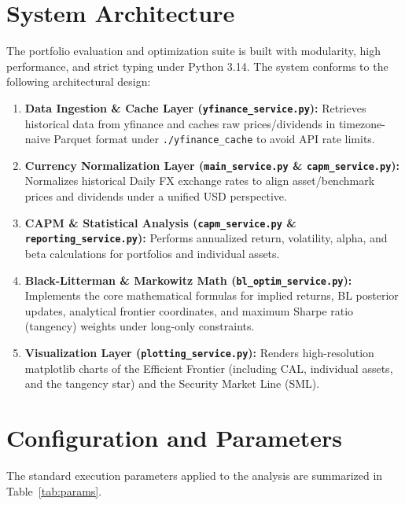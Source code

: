 \documentclass[11pt,a4paper]{article}
\begin{document}
\section{System Architecture}

The portfolio evaluation and optimization suite is built with modularity, high performance, and strict typing under Python 3.14. The system conforms to the following architectural design:

\begin{enumerate}
    \item \textbf{Data Ingestion \& Cache Layer (\texttt{yfinance\_service.py}):} Retrieves historical data from yfinance and caches raw prices/dividends in timezone-naive Parquet format under \texttt{./yfinance\_cache} to avoid API rate limits.
    \item \textbf{Currency Normalization Layer (\texttt{main\_service.py} \& \texttt{capm\_service.py}):} Normalizes historical Daily FX exchange rates to align asset/benchmark prices and dividends under a unified USD perspective.
    \item \textbf{CAPM \& Statistical Analysis (\texttt{capm\_service.py} \& \texttt{reporting\_service.py}):} Performs annualized return, volatility, alpha, and beta calculations for portfolios and individual assets.
    \item \textbf{Black-Litterman \& Markowitz Math (\texttt{bl\_optim\_service.py}):} Implements the core mathematical formulas for implied returns, BL posterior updates, analytical frontier coordinates, and maximum Sharpe ratio (tangency) weights under long-only constraints.
    \item \textbf{Visualization Layer (\texttt{plotting\_service.py}):} Renders high-resolution matplotlib charts of the Efficient Frontier (including CAL, individual assets, and the tangency star) and the Security Market Line (SML).
\end{enumerate}

\section{Configuration and Parameters}

The standard execution parameters applied to the analysis are summarized in Table~\ref{tab:params}.
\end{document}
